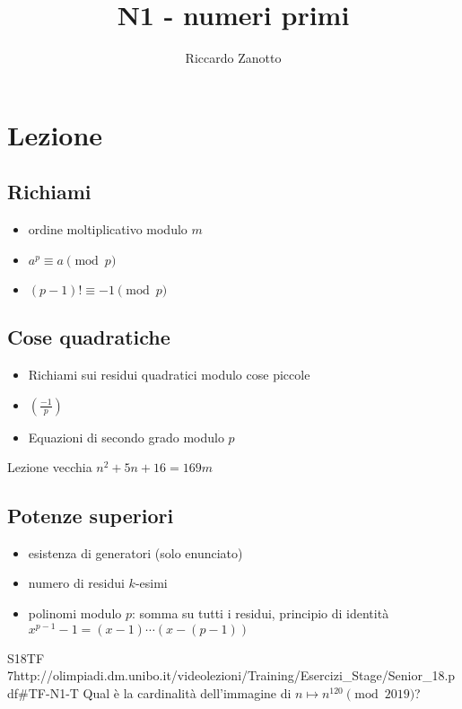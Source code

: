 \documentclass[12pt]{article}
\author{Riccardo Zanotto}
\title{N1 - numeri primi}
\begin{document}
\maketitle


\section{Lezione}

\subsection{Richiami}
\begin{itemize}
    \item ordine moltiplicativo modulo $m$
    \item $a^p\equiv a\pmod p$
    \item $(p-1)!\equiv-1\pmod p$
\end{itemize}

\subsection{Cose quadratiche}

\begin{itemize}
    \item Richiami sui residui quadratici modulo cose piccole
    \item $\left( \frac{-1}{p} \right)$
    \item Equazioni di secondo grado modulo $p$
\end{itemize}

\begin{esercizio}{Lezione vecchia}{}{}
    $n^2+5n+16=169m$
\end{esercizio}

\subsection{Potenze superiori}
\begin{itemize}
    \item esistenza di generatori (solo enunciato)
    \item numero di residui $k$-esimi
    \item polinomi modulo $p$: somma su tutti i residui, principio di identità $x^{p-1}-1=(x-1)\cdots(x-(p-1))$
\end{itemize}

\begin{esercizio}{S18TF 7}{http://olimpiadi.dm.unibo.it/videolezioni/Training/Esercizi_Stage/Senior_18.pdf\#TF-N1-T}
    Qual è la cardinalità dell'immagine di $n\mapsto n^{120}\pmod{2019}$?
\end{esercizio}
\end{document}
